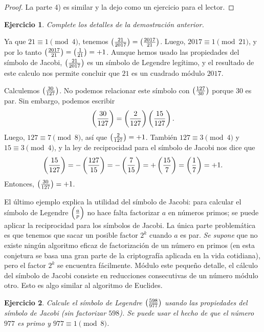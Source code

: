 \documentclass{article}
\theoremstyle{plain}
\newtheorem{ejerc}{Ejercicio}
\begin{document}
\begin{proposicion}
\begin{proof}
    La parte 4) es similar y la dejo como un ejercicio para el lector.
  \end{proof}
\end{proposicion}

\begin{ejerc}
  Complete los detalles de la demostración anterior.
\end{ejerc}

\begin{ejemplo}
  Ya que $21 \equiv 1 \pmod{4}$, tenemos
  $\left(\frac{21}{2017}\right) = \left(\frac{2017}{21}\right)$. Luego, $2017 \equiv 1 \pmod{21}$,
  y por lo tanto $\left(\frac{2017}{21}\right) = \left(\frac{1}{21}\right) = +1$. Aunque hemos
  usado las propiedades del símbolo de Jacobi, $\left(\frac{21}{2017}\right)$ es un
  símbolo de Legendre legítimo, y el resultado de este calculo nos permite
  concluir que $21$ es un cuadrado módulo $2017$.
\end{ejemplo}

\begin{ejemplo}
  Calculemos $\left(\frac{30}{127}\right)$. No podemos relacionar este símbolo con
  $\left(\frac{127}{30}\right)$ porque $30$ es par. Sin embargo, podemos escribir
  $$\left(\frac{30}{127}\right) = \left(\frac{2}{127}\right)\left(\frac{15}{127}\right).$$
  Luego, $127 \equiv 7 \pmod{8}$, así que $\left(\frac{2}{127}\right) = +1$. También
  $127 \equiv 3 \pmod{4}$ y $15 \equiv 3 \pmod{4}$, y la ley de reciprocidad
  para el símbolo de Jacobi nos dice que
  $$\left(\frac{15}{127}\right) = -\left(\frac{127}{15}\right) = -\left(\frac{7}{15}\right) = +\left(\frac{15}{7}\right) = \left(\frac{1}{7}\right) = +1.$$
  Entonces, $\left(\frac{30}{127}\right) = +1$.
\end{ejemplo}

El último ejemplo explica la utilidad del símbolo de Jacobi: para calcular el
símbolo de Legendre $\left(\frac{a}{p}\right)$ no hace falta factorizar $a$ en números
primos; se puede aplicar la reciprocidad para los símbolos de Jacobi. La única
parte problemática es que tenemos que sacar un posible factor $2^k$ cuando $a$
es par. \emph{Se supone} que no existe ningún algoritmo eficaz de factorización
de un número en primos (en esta conjetura se basa una gran parte de la
criptografía aplicada en la vida cotidiana), pero el factor $2^k$ se encuentra
fácilmente. Módulo este pequeño detalle, el cálculo del símbolo de Jacobi
consiste en reducciones consecutivas de un número módulo otro. Esto es algo
similar al algoritmo de Euclides.

\begin{ejerc}
  Calcule el símbolo de Legendre $\left(\frac{598}{977}\right)$ usando las propiedades
  del símbolo de Jacobi (sin factorizar $598$). Se puede usar el hecho de que el
  número $977$ es primo y $977 \equiv 1 \pmod{8}$.
\end{ejerc}
\end{document}
